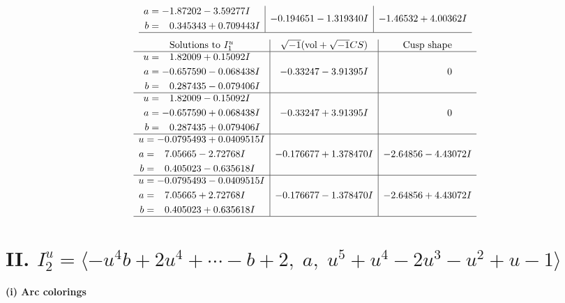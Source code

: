 \documentclass[1p]{elsarticle_modified}
\theoremstyle{definition}
\newcommand{\I}{\sqrt{-1}}
\begin{document}
$$\begin{array}{c|c|c}
\begin{aligned}
a &= -1.87202 - 3.59277 I \\
b &= \phantom{-}0.345343 + 0.709443 I\end{aligned}
 & -0.194651 - 1.319340 I & -1.46532 + 4.00362 I\\
 \hline 
 \end{array}$$\newpage$$\begin{array}{c|c|c}  
\text{Solutions to }I^u_{1}& \I (\text{vol} + \sqrt{-1}CS) & \text{Cusp shape}\\
 \hline 
\begin{aligned}
u &= \phantom{-}1.82009 + 0.15092 I \\
a &= -0.657590 - 0.068438 I \\
b &= \phantom{-}0.287435 - 0.079406 I\end{aligned}
 & -0.33247 - 3.91395 I & \phantom{-0.000000 } 0 \\ \hline\begin{aligned}
u &= \phantom{-}1.82009 - 0.15092 I \\
a &= -0.657590 + 0.068438 I \\
b &= \phantom{-}0.287435 + 0.079406 I\end{aligned}
 & -0.33247 + 3.91395 I & \phantom{-0.000000 } 0 \\ \hline\begin{aligned}
u &= -0.0795493 + 0.0409515 I \\
a &= \phantom{-}7.05665 - 2.72768 I \\
b &= \phantom{-}0.405023 - 0.635618 I\end{aligned}
 & -0.176677 + 1.378470 I & -2.64856 - 4.43072 I \\ \hline\begin{aligned}
u &= -0.0795493 - 0.0409515 I \\
a &= \phantom{-}7.05665 + 2.72768 I \\
b &= \phantom{-}0.405023 + 0.635618 I\end{aligned}
 & -0.176677 - 1.378470 I & -2.64856 + 4.43072 I\\
 \hline 
 \end{array}$$\newpage\newpage\renewcommand{\arraystretch}{1}
\centering \section*{II. $I^u_{2}= \langle - u^4 b+2 u^4+\cdots- b+2,\;a,\;u^5+u^4-2 u^3- u^2+u-1 \rangle$}
\flushleft \textbf{(i) Arc colorings}\\
\end{document}
